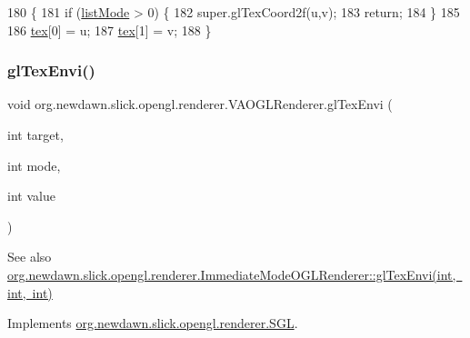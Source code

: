 \begin{DoxyCode}
180                                                \{
181         \textcolor{keywordflow}{if} (\mbox{\hyperlink{classorg_1_1newdawn_1_1slick_1_1opengl_1_1renderer_1_1_v_a_o_g_l_renderer_afee8361b229cada04ad11d9ee44c7284}{listMode}} > 0) \{
182             super.glTexCoord2f(u,v);
183             \textcolor{keywordflow}{return};
184         \}
185         
186         \mbox{\hyperlink{classorg_1_1newdawn_1_1slick_1_1opengl_1_1renderer_1_1_v_a_o_g_l_renderer_a83feee944281be5b53b0f654df3e84f5}{tex}}[0] = u;
187         \mbox{\hyperlink{classorg_1_1newdawn_1_1slick_1_1opengl_1_1renderer_1_1_v_a_o_g_l_renderer_a83feee944281be5b53b0f654df3e84f5}{tex}}[1] = v;
188     \}
\end{DoxyCode}
\mbox{\label{classorg_1_1newdawn_1_1slick_1_1opengl_1_1renderer_1_1_v_a_o_g_l_renderer_a4827ab4e89a258c0343dbf1e0e87ecfd}} 
\subsubsection{\texorpdfstring{gl\+Tex\+Envi()}{glTexEnvi()}}
{\footnotesize\ttfamily void org.\+newdawn.\+slick.\+opengl.\+renderer.\+V\+A\+O\+G\+L\+Renderer.\+gl\+Tex\+Envi (\begin{DoxyParamCaption}\item[{int}]{target,  }\item[{int}]{mode,  }\item[{int}]{value }\end{DoxyParamCaption})\hspace{0.3cm}{\ttfamily [inline]}}

\begin{DoxySeeAlso}{See also}
\mbox{\hyperlink{classorg_1_1newdawn_1_1slick_1_1opengl_1_1renderer_1_1_immediate_mode_o_g_l_renderer_ac494c89daacc662a13738f125120b202}{org.\+newdawn.\+slick.\+opengl.\+renderer.\+Immediate\+Mode\+O\+G\+L\+Renderer\+::gl\+Tex\+Envi(int, int, int)}} 
\end{DoxySeeAlso}


Implements \mbox{\hyperlink{interfaceorg_1_1newdawn_1_1slick_1_1opengl_1_1renderer_1_1_s_g_l_a86e50032d7f9a3e8268fb20e5ce644ee}{org.\+newdawn.\+slick.\+opengl.\+renderer.\+S\+GL}}.


